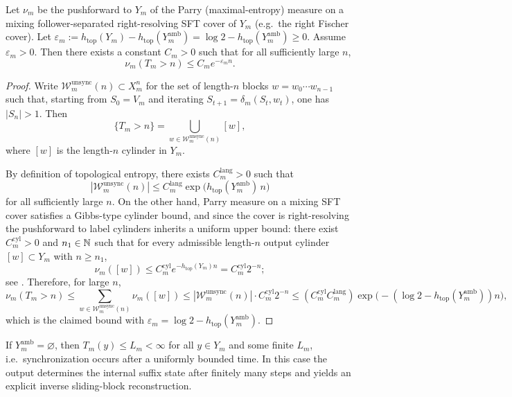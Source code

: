 \begin{theorem}\label{thm:sync-tail-entropy-gap}
Let $\nu_m$ be the pushforward to $Y_m$ of the Parry (maximal-entropy) measure on a mixing follower-separated right-resolving SFT cover of $Y_m$ (e.g.\ the right Fischer cover).
Let $\varepsilon_m:=h_{\mathrm{top}}(Y_m)-h_{\mathrm{top}}(Y_m^{\mathrm{amb}})=\log 2-h_{\mathrm{top}}(Y_m^{\mathrm{amb}})\ge 0$.
Assume $\varepsilon_m>0$.
Then there exists a constant $C_m>0$ such that for all sufficiently large $n$,
\[
\nu_m(T_m>n)\le C_m e^{-\varepsilon_m n}.
\]
\end{theorem}
\begin{proof}
Write $\mathcal{W}_m^{\mathrm{unsync}}(n)\subset X_m^n$ for the set of length-$n$ blocks $w=w_0\cdots w_{n-1}$ such that, starting from $S_0=V_m$ and iterating $S_{t+1}=\delta_m(S_t,w_t)$, one has $|S_n|>1$.
Then
\[
\{T_m>n\}=\bigcup_{w\in\mathcal{W}_m^{\mathrm{unsync}}(n)} [w],
\]
where $[w]$ is the length-$n$ cylinder in $Y_m$.
\par
By definition of topological entropy, there exists $C_m^{\mathrm{lang}}>0$ such that
\[
|\mathcal{W}_m^{\mathrm{unsync}}(n)|
\le
C_m^{\mathrm{lang}}\exp\!\bigl(h_{\mathrm{top}}(Y_m^{\mathrm{amb}})\,n\bigr)
\]
for all sufficiently large $n$.
On the other hand, Parry measure on a mixing SFT cover satisfies a Gibbs-type cylinder bound, and since the cover is right-resolving the pushforward to label cylinders inherits a uniform upper bound: there exist $C_m^{\mathrm{cyl}}>0$ and $n_1\in\mathbb{N}$ such that for every admissible length-$n$ output cylinder $[w]\subset Y_m$ with $n\ge n_1$,
\[
\nu_m([w])\le C_m^{\mathrm{cyl}}e^{-h_{\mathrm{top}}(Y_m)n}=C_m^{\mathrm{cyl}}2^{-n};
\]
see \cite[Chapter~4]{LindMarcus1995}.
Therefore, for large $n$,
\[
\nu_m(T_m>n)
\le
\sum_{w\in\mathcal{W}_m^{\mathrm{unsync}}(n)}\nu_m([w])
\le
|\mathcal{W}_m^{\mathrm{unsync}}(n)|\cdot C_m^{\mathrm{cyl}}2^{-n}
\le
(C_m^{\mathrm{cyl}}C_m^{\mathrm{lang}})\exp\!\bigl(-(\log 2-h_{\mathrm{top}}(Y_m^{\mathrm{amb}}))n\bigr),
\]
which is the claimed bound with $\varepsilon_m=\log 2-h_{\mathrm{top}}(Y_m^{\mathrm{amb}})$.
\end{proof}

\begin{remark}\label{rem:amb-shell-empty}
If $Y_m^{\mathrm{amb}}=\varnothing$, then $T_m(y)\le L_m<\infty$ for all $y\in Y_m$ and some finite $L_m$, i.e.\ synchronization occurs after a uniformly bounded time.
In this case the output determines the internal suffix state after finitely many steps and yields an explicit inverse sliding-block reconstruction.
\end{remark}

